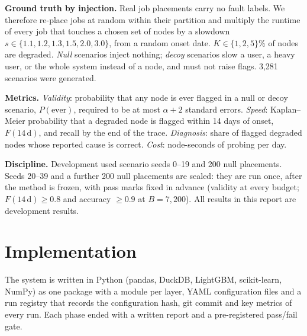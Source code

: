 \documentclass[10pt,a4paper]{article}
\begin{document}
\textbf{Ground truth by injection.} Real job placements carry no fault labels. We therefore re-place jobs at random within their partition and multiply the runtime of every job that touches a chosen set of nodes by a slowdown $s \in \{1.1, 1.2, 1.3, 1.5, 2.0, 3.0\}$, from a random onset date. $K \in \{1, 2, 5\}\%$ of nodes are degraded. \emph{Null} scenarios inject nothing; \emph{decoy} scenarios slow a user, a heavy user, or the whole system instead of a node, and must not raise flags. 3{,}281 scenarios were generated.

\textbf{Metrics.} \emph{Validity}: probability that any node is ever flagged in a null or decoy scenario, $P(\text{ever})$, required to be at most $\alpha + 2$ standard errors. \emph{Speed}: Kaplan--Meier probability that a degraded node is flagged within 14 days of onset, $F(14\,\mathrm{d})$, and recall by the end of the trace. \emph{Diagnosis}: share of flagged degraded nodes whose reported cause is correct. \emph{Cost}: node-seconds of probing per day.

\textbf{Discipline.} Development used scenario seeds 0--19 and 200 null placements. Seeds 20--39 and a further 200 null placements are sealed: they are run once, after the method is frozen, with pass marks fixed in advance (validity at every budget; $F(14\,\mathrm{d}) \ge 0.8$ and accuracy $\ge 0.9$ at $B = 7{,}200$). All results in this report are development results.

\section{Implementation}
The system is written in Python (pandas, DuckDB, LightGBM, scikit-learn, NumPy) as one package with a module per layer, YAML configuration files and a run registry that records the configuration hash, git commit and key metrics of every run. Each phase ended with a written report and a pre-registered pass/fail gate.
\end{document}
